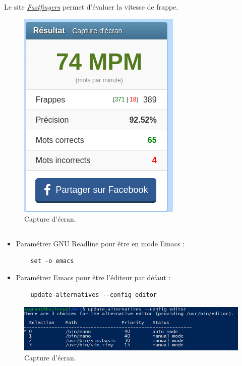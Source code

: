 \documentclass{article}
\begin{document}
Le site \href{https://10fastfingers.com/typing-test/french}{\emph{Fastfingers}} permet d’évaluer la vitesse de frappe.

\begin{figure}[h]
\centering
\includegraphics[height=\textwidth]{images/q1-2.jpg}
\caption{\label{fig:frog}Capture d'écran.}
\end{figure}
\FloatBarrier
\subsection{}

\begin{itemize}
    \item Paramétrer GNU Readline pour être en mode Emacs :
    \begin{lstlisting}
    set -o emacs
    \end{lstlisting}
    \item Paramétrer Emacs pour être l’éditeur par défaut :
    \begin{lstlisting}
    update-alternatives --config editor
    \end{lstlisting}
\end{itemize}

\begin{figure}[h]
\centering
\includegraphics[width=\textwidth]{images/q1-3.jpg}
\caption{\label{fig:frog}Capture d'écran.}
\end{figure}
\end{document}

